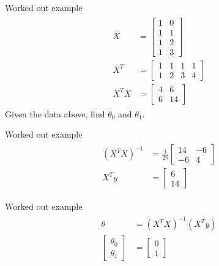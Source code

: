 \documentclass{beamer}
\begin{document}
\begin{frame}{Worked out example}
\begin{align}
    \begin{split}
        X &= \begin{bmatrix}
            1 & 0\\
            1 & 1\\
            1 & 2\\
            1 & 3
        \end{bmatrix}\\
        X^{T} &= \begin{bmatrix}
            1&1&1&1\\
            1&2&3&4
        \end{bmatrix}\\
        X^{T}X &= \begin{bmatrix}
            4 &6\\6&14
        \end{bmatrix}
    \end{split}
\end{align}
Given the data above, find $\theta_{0}$ and $\theta_{1}$.
\end{frame}


\begin{frame}{Worked out example}
    \begin{align}
        \begin{split}
            (X^{T}X)^{-1} &= \frac{1}{20} \begin{bmatrix}
                14 & -6\\
                -6& 4
            \end{bmatrix}\\
            X^{T}y &= \begin{bmatrix}
                6\\
                14
            \end{bmatrix}
        \end{split}
    \end{align}
\end{frame}


\begin{frame}{Worked out example}
    \begin{align}
        \begin{split}
            \theta &= (X^{T}X)^{-1}(X^{T}y)\\
            \begin{bmatrix}
        \theta_{0}\\
        \theta_{1}
    \end{bmatrix} &= 
    \begin{bmatrix}
        0\\
        1
    \end{bmatrix} 
        \end{split}
    \end{align}
\end{frame}
\end{document}

